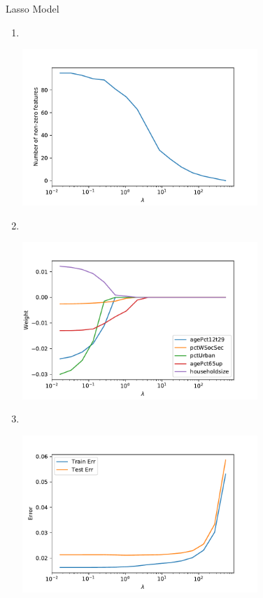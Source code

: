 \documentclass{article}
\begin{document}
Lasso Model
\begin{enumerate}
        \item \, \newline \vspace{-1.5cm}
        \begin{center}
                \includegraphics[width=0.7\textwidth]{code/A5a.pdf}
        \end{center}

        \item \, \newline \vspace{-1.5cm}
        \begin{center}
                \includegraphics[width=0.7\textwidth]{code/A5b.pdf}
        \end{center}

        \item \, \newline \vspace{-1.5cm}
        \begin{center}
                \includegraphics[width=0.7\textwidth]{code/A5c.pdf}
        \end{center}


\end{enumerate}
\end{document}
